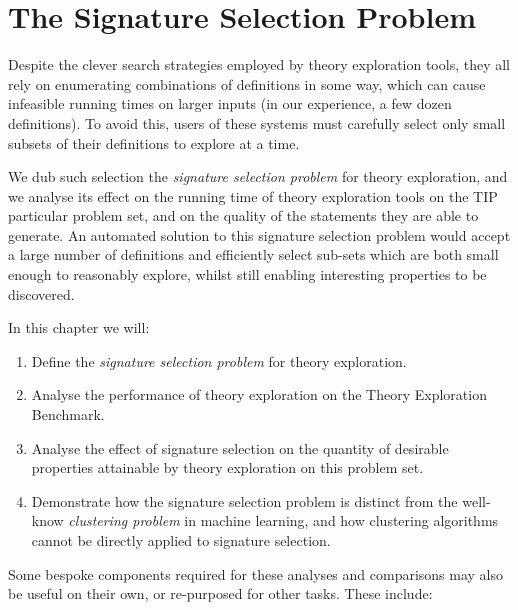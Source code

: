 \section{The Signature Selection Problem}

Despite the clever search strategies employed by theory exploration tools, they
all rely on enumerating combinations of definitions in some way, which can cause
infeasible running times on larger inputs (in our experience, a few dozen
definitions). To avoid this, users of these systems must carefully select only
small subsets of their definitions to explore at a time.

We dub such selection the \emph{signature selection problem} for theory
exploration, and we analyse its effect on the running time of theory exploration
tools on the TIP particular problem set, and on the quality of the statements
they are able to generate. An automated solution to this signature selection problem would
accept a large number of definitions and efficiently select sub-sets which are
both small enough to reasonably explore, whilst still enabling interesting
properties to be discovered.

In this chapter we will:

\begin{enumerate}
  \item Define the \emph{signature selection problem} for theory exploration.
  \item Analyse the performance of theory exploration on the Theory Exploration
    Benchmark.
  \item Analyse the effect of signature selection on the quantity of desirable properties
    attainable by theory exploration on this problem set.
  \item Demonstrate how the signature selection problem is distinct from the well-know
    \emph{clustering problem} in machine learning, and how clustering algorithms
    cannot be directly applied to signature selection.
\end{enumerate}

Some bespoke components required for these analyses and comparisons may also be
useful on their own, or re-purposed for other tasks. These include:

